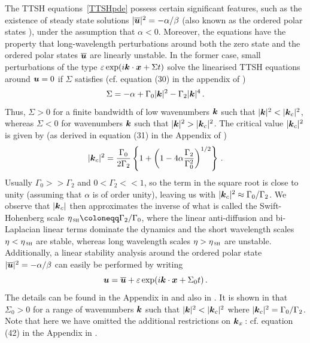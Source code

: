\documentclass[11pt]{amsart}
\newcommand{\bk}{\mbox{\boldmath$k$}}
\newcommand{\bu}{\mbox{\boldmath$u$}}
\newcommand{\bx}{\mbox{\boldmath$x$}}
\newcommand{\bel}{\begin{equation}\label}
\newcommand{\ee}{\end{equation}}
\theoremstyle{definition}
\numberwithin{equation}{section}
\numberwithin{equation}{section}
\begin{document}
\par\smallskip
The TTSH equations~\eqref{TTSHpde} possess certain significant features, such as the existence of steady state solutions $|\overline{\bu}|^{2} = -\alpha/\beta$ (also known as the ordered polar states \cite{wensink2012}), under the assumption that $\alpha < 0$. Moreover, the equations have the property that long-wavelength perturbations around both the zero state and the ordered polar states $\overline{\bu}$ are linearly unstable. In the former case, small perturbations of the type $\varepsilon\exp(i\bk\cdot\bx + \Sigma t)$ solve the linearised TTSH equations around $\bu=0$ if $\Sigma$ satisfies (cf. equation (30) in the appendix of \cite{wensink2012})
\bel{gr1}
\Sigma = -\alpha + \Gamma_{0}\lvert \bk \rvert^{2} - \Gamma_{2} \lvert \bk \rvert^{4}\,.
\ee
Thus, $\Sigma > 0$ for a finite bandwidth of low wavenumbers $\bk$ such that $\lvert \bk \rvert^{2} < \lvert \bk_{c} \rvert^{2}$, whereas $\Sigma < 0$ for wavenumbers $\bk$ such that $\lvert \bk \rvert^{2} > \lvert \bk_{c} \rvert^{2}$. The critical value $\lvert \bk_{c} \rvert^{2}$ is given by (as derived in equation (31) in the Appendix of \cite{wensink2012})
\bel{SHscale}
\lvert \bk_{c} \rvert^{2} = \frac{\Gamma_{0}}{2\Gamma_{2}}\left\{1 + \left(1 - 4\alpha\frac{\Gamma_{2}}{\Gamma_{0}^2}\right)^{1/2}\right\}\,.
\ee
Usually $\Gamma_{0} >> \Gamma_{2}$ and $0 < \Gamma_{2}<<1$, so the term in the square root is close to unity (assuming that $\alpha$ is of order unity), leaving us with $\lvert \bk_{c} \rvert^{2} \approx \Gamma_{0}/\Gamma_{2}$. We observe that $\lvert \bk_{c} \rvert$ then approximates the inverse of what is called the Swift-Hohenberg scale $\eta_{\,\textsc{sh}} \coloneqq \Gamma_{2}/\Gamma_{0}$, where the linear anti-diffusion and bi-Laplacian linear terms dominate the dynamics and the short wavelength scales $\eta < \eta_{\,\textsc{sh}}$ are stable, whereas long wavelength scales $\eta > \eta_{\,\textsc{sh}}$ are unstable. Additionally, a linear stability analysis around the ordered polar state $|\overline{\bu}|^{2} = -\alpha/\beta$ can easily be performed by writing 
\bel{steady}
\bu = \overline{\bu} + \varepsilon \exp(i\bk\cdot\bx + \Sigma_{0} t)\,.
\ee
The details can be found in the Appendix in \cite{wensink2012} and also in \cite{bui2019,bui2023}. It is shown in \cite{wensink2012} that $\Sigma_{0} > 0$ for a range of wavenumbers $\bk$ such that $\lvert \bk \rvert^{2} < \lvert \bk_{c} \rvert^{2}$ where $\lvert \bk_{c} \rvert^{2} = \Gamma_{0}/\Gamma_{2}$. Note that here we have omitted the additional restrictions on $\bk_x$\,: cf. equation (42) in the Appendix in \cite{wensink2012}.
\end{document}
